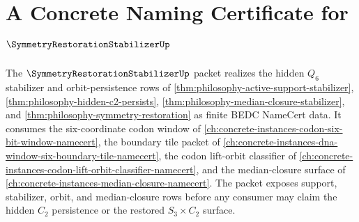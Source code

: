 \chapter{A Concrete Naming Certificate for $\SymmetryRestorationStabilizerUp$}
\label{ch:concrete-instances-symmetry-restoration-stabilizer-namecert}

The $\SymmetryRestorationStabilizerUp$ packet realizes the hidden $Q_{6}$
stabilizer and orbit-persistence rows of
\autoref{thm:philosophy-active-support-stabilizer},
\autoref{thm:philosophy-hidden-c2-persists},
\autoref{thm:philosophy-median-closure-stabilizer}, and
\autoref{thm:philosophy-symmetry-restoration} as finite BEDC NameCert data.
It consumes the six-coordinate codon window of
\autoref{ch:concrete-instances-codon-six-bit-window-namecert}, the boundary
tile packet of
\autoref{ch:concrete-instances-dna-window-six-boundary-tile-namecert}, the
codon lift-orbit classifier of
\autoref{ch:concrete-instances-codon-lift-orbit-classifier-namecert}, and
the median-closure surface of
\autoref{ch:concrete-instances-median-closure-namecert}. The packet exposes
support, stabilizer, orbit, and median-closure rows before any consumer may
claim the hidden $C_{2}$ persistence or the restored $S_{3}\times C_{2}$
surface.

